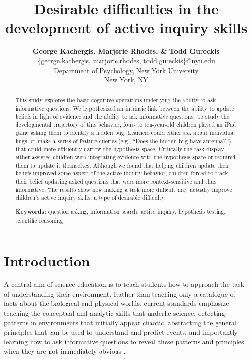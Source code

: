 \documentclass[10pt,letterpaper]{article}
\title{Desirable difficulties in the development of active inquiry skills}
\author{
  {\large \bf George Kachergis, Marjorie Rhodes, \& Todd Gureckis} \\
  \{george.kachergis, marjorie.rhodes, todd.gureckis\}@nyu.edu \\
  Department of Psychology, New York University \\
  New York, NY
}
\begin{document}
\maketitle

\begin{abstract}
This study explores the basic cognitive operations underlying the ability to ask informative questions.  We hypothesized an intrinsic link between the ability to update beliefs in light of evidence and the ability to ask informative questions. To study the developmental trajectory of this behavior, four- to ten-year-old children played an iPad game asking them to identify a hidden bug. Learners could either ask about individual bugs, or make a series of feature queries (e.g., ``Does the hidden bug have antenna?'') that could more efficiently narrow the hypothesis space. Critically the task display either assisted children with integrating evidence with the hypothesis space or required them to update it themselves.  Although we found that helping children update their beliefs improved some aspect of the active inquiry behavior, children forced to track their belief updating asked questions that were more context-sensitive and thus informative.  The results show how making a task more difficult may actually improve children's active inquiry skills, a type of desirable difficulty.

\textbf{Keywords:} 
question asking, information search, active inquiry, hypothesis testing, scientific reasoning
\end{abstract}


\section{Introduction} 


A central aim of science education is to teach students how to approach the task of understanding their environment. Rather than teaching only a catalogue of facts about the biological and physical worlds, current standards emphasize teaching the conceptual and analytic skills that underlie science: detecting patterns in environments that initially appear chaotic, abstracting the general principles that can be used to understand and predict events, and importantly learning how to ask informative questions to reveal these patterns and principles when they are not immediately obvious \cite{Bransford:2000,Donovan:2005,Duschl:2007}. 
\end{document}
